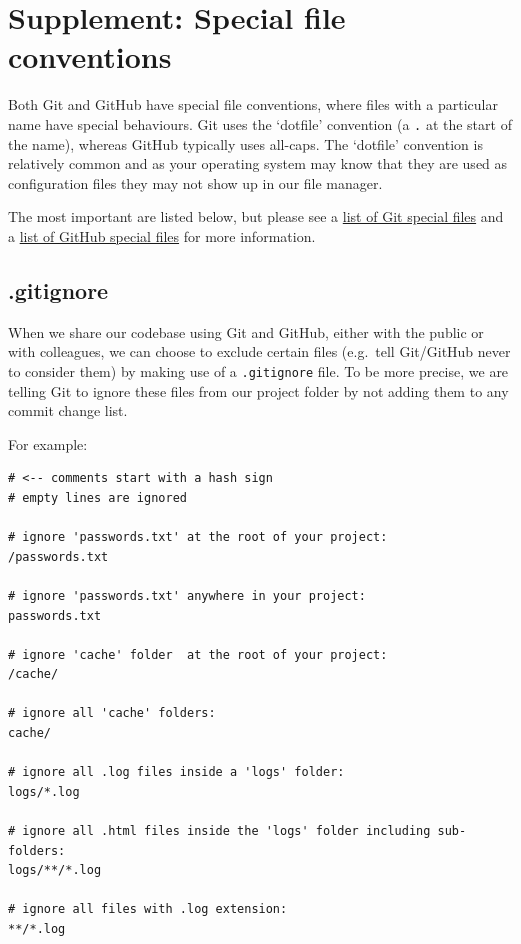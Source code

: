 \documentclass[
  letterpaper,
  DIV=11,
  numbers=noendperiod]{scrartcl}
\begin{document}
\section{Supplement: Special file
conventions}\label{supplement-special-file-conventions}

Both Git and GitHub have special file conventions, where files with a
particular name have special behaviours. Git uses the `dotfile'
convention (a \texttt{.} at the start of the name), whereas GitHub
typically uses all-caps. The `dotfile' convention is relatively common
and as your operating system may know that they are used as
configuration files they may not show up in our file manager.

The most important are listed below, but please see a
\href{https://stackoverflow.com/questions/12605576\#12719247}{list of
Git special files} and a
\href{https://github.com/joelparkerhenderson/github-special-files-and-paths}{list
of GitHub special files} for more information.

\subsection{.gitignore}\label{gitignore}

When we share our codebase using Git and GitHub, either with the public
or with colleagues, we can choose to exclude certain files (e.g.~tell
Git/GitHub never to consider them) by making use of a
\texttt{.gitignore} file. To be more precise, we are telling Git to
ignore these files from our project folder by not adding them to any
commit change list.

For example:

\begin{verbatim}
# <-- comments start with a hash sign
# empty lines are ignored

# ignore 'passwords.txt' at the root of your project:
/passwords.txt

# ignore 'passwords.txt' anywhere in your project:
passwords.txt

# ignore 'cache' folder  at the root of your project:
/cache/

# ignore all 'cache' folders:
cache/

# ignore all .log files inside a 'logs' folder:
logs/*.log

# ignore all .html files inside the 'logs' folder including sub-folders:
logs/**/*.log

# ignore all files with .log extension:
**/*.log
\end{verbatim}
\end{document}
